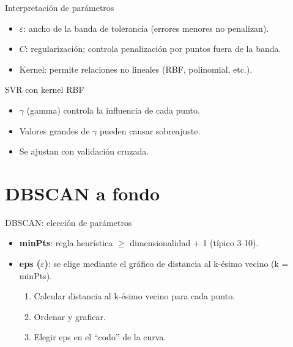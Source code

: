 \documentclass[aspectratio=169, 10pt, xcolor=table]{beamer}
\begin{document}
\begin{frame}{Interpretación de parámetros}
    \begin{itemize}
        \item $\varepsilon$: ancho de la banda de tolerancia (errores menores no penalizan).
        \item $C$: regularización; controla penalización por puntos fuera de la banda.
        \item Kernel: permite relaciones no lineales (RBF, polinomial, etc.).
    \end{itemize}
    \begin{exampleblock}{SVR con kernel RBF}
        \begin{itemize}
            \item $\gamma$ (gamma) controla la influencia de cada punto.
            \item Valores grandes de $\gamma$ pueden causar sobreajuste.
            \item Se ajustan con validación cruzada.
        \end{itemize}
    \end{exampleblock}
\end{frame}

\section{DBSCAN a fondo}

\begin{frame}{DBSCAN: elección de parámetros}
    \begin{itemize}
        \item \textbf{minPts}: regla heurística $\ge$ dimensionalidad + 1 (típico 3-10).
        \item \textbf{eps ($\varepsilon$)}: se elige mediante el gráfico de distancia al k-ésimo vecino (k = minPts).
        \begin{enumerate}
            \item Calcular distancia al k-ésimo vecino para cada punto.
            \item Ordenar y graficar.
            \item Elegir eps en el ``codo'' de la curva.
        \end{enumerate}
    \end{itemize}
\end{frame}
\end{document}
